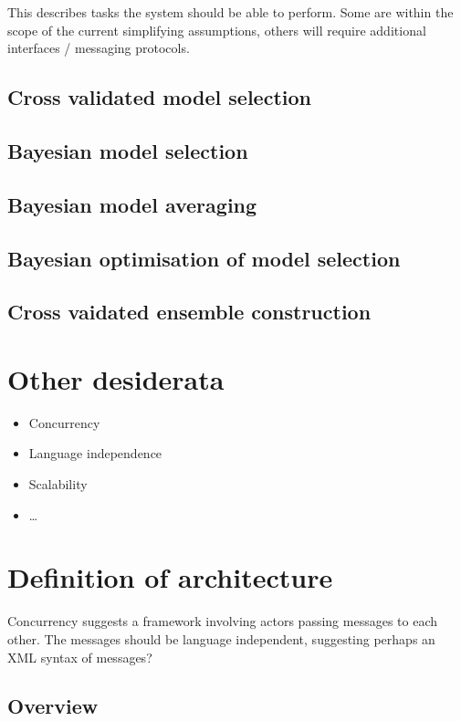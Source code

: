 \documentclass[twoside,11pt]{article}
\begin{document}
This describes tasks the system should be able to perform.
Some are within the scope of the current simplifying assumptions, others will require additional interfaces / messaging protocols.

\subsection{Cross validated model selection}

\subsection{Bayesian model selection}

\subsection{Bayesian model averaging}

\subsection{Bayesian optimisation of model selection}

\subsection{Cross vaidated ensemble construction}

\section{Other desiderata}

\begin{itemize}
  \item Concurrency
  \item Language independence
  \item Scalability
  \item \dots
\end{itemize}

\section{Definition of architecture}

Concurrency suggests a framework involving actors passing messages to each other.
The messages should be language independent, suggesting perhaps an XML syntax of messages?

\subsection{Overview}
\end{document}
